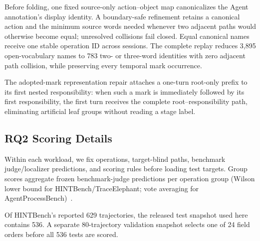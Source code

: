 \documentclass[letterpaper]{article}
\begin{document}
Before folding, one fixed source-only action--object map canonicalizes the
Agent annotation's display identity. A boundary-safe refinement retains a canonical action and
the minimum source words needed whenever two adjacent paths would otherwise
become equal; unresolved collisions fail closed. Equal canonical names receive
one stable operation ID across sessions. The complete replay reduces 3{,}895
open-vocabulary names to 783 two- or three-word identities with zero
adjacent path collision, while preserving every temporal mark occurrence.

The adopted-mark representation repair attaches a one-turn root-only prefix to its first
nested responsibility: when such a mark is immediately followed by its first
responsibility, the first turn receives the complete root--responsibility path,
eliminating artificial leaf groups without reading a stage label.

\subsection{RQ2 Scoring Details}
\label{app:rq2-scoring}

Within each workload, we fix operations, target-blind paths, benchmark
judge/localizer predictions, and scoring rules before loading test targets.
Group scores aggregate frozen benchmark-judge predictions per operation group
(Wilson lower bound for HINTBench/TraceElephant; vote averaging for
AgentProcessBench)~\cite{wilson1927}.

Of HINTBench's reported 629 trajectories, the released test snapshot used here
contains 536. A separate 80-trajectory validation snapshot selects one of 24
field orders before all 536 tests are scored.
\end{document}
